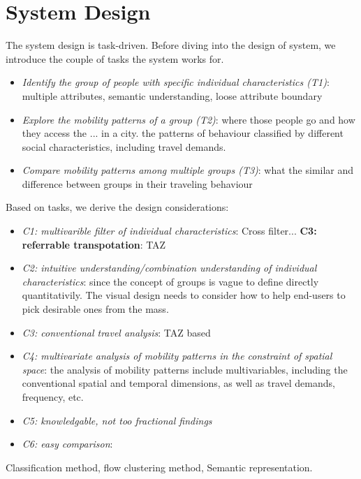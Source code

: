\section{System Design}

The system design is task-driven. Before diving into the design of system, we introduce  the couple of tasks the system works for. 

\begin{itemize}
\item \textit{Identify the group of people with specific individual characteristics (T1)}: multiple attributes, semantic understanding, loose attribute boundary
\item \textit{Explore the mobility patterns of a group (T2)}: where those people go and how they access the ... in a city. the patterns of behaviour classified by different social characteristics, including travel demands. 
\item \textit{Compare mobility patterns among multiple groups (T3)}: what the similar and difference between groups in their traveling behaviour
\end{itemize}

Based on tasks, we derive the design considerations:

\begin{itemize}
\item \textit{C1: multivarible filter of individual characteristics}: Cross filter...
\textbf{C3: referrable transpotation}: TAZ
\item \textit{C2: intuitive understanding/combination understanding of individual characteristics}: since the concept of groups is vague to define directly quantitativily. The visual design needs to consider how to help end-users to pick desirable ones from the mass. 
\item \textit{C3: conventional travel analysis}: TAZ based
\item \textit{C4: multivariate analysis of mobility patterns in the constraint of spatial space}: the analysis of mobility patterns include multivariables, including the conventional spatial and temporal dimensions, as well as travel demands, frequency, etc.
\item \textit{C5: knowledgable, not too fractional findings}
\item \textit{C6: easy comparison}: 
\end{itemize}

Classification method, flow clustering method, Semantic representation. 

